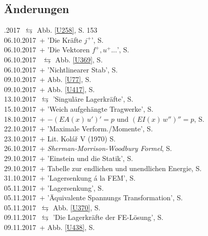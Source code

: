 {\textcolor{blau2}{\section*{\"{A}nderungen}}

{.2017} \,$\leftrightarrows$ Abb. \ref{U258}, S. 153\\
06.10.2017 \,+ 'Die Kr\"{a}fte $j^+$', S. \pageref{Korrektur1}\\
06.10.2017 \,+  'Die Vektoren $f^+, u^+ ...$', S. \pageref{Korrektur2} \\
06.10.2017 \, $\leftrightarrows$ Abb. \ref{U369}, S. \pageref{Korrektur4} \\
06.10.2017 \,+  'Nichtlinearer Stab', S. \pageref{Korrektur5} \\
09.10.2017 \,+ Abb. \ref{U77}, S. \pageref{Korrektur6} \\
09.10.2017 \,+ Abb. \ref{U417}, S. \pageref{Korrektur7} \\
13.10.2017 \,$\leftrightarrows$  'Singul\"{a}re Lagerkr\"{a}fte', S. \pageref{Korrektur9} \\
15.10.2017 \,+  'Weich aufgeh\"{a}ngte Tragwerke', S. \pageref{Korrektur10} \\
18.10.2017 \,+ $-(EA(x)\,u')' = p$ und $(EI(x)\,w'')'' = p$, S. \pageref{Korrektur11} \\
22.10.2017 \,+  'Maximale Verform./Momente', S. \pageref{Korrektur12} \\
23.10.2017 \,+ Lit. Kol\'{a}\v{r} V (1970) S. \pageref{Korrektur13} \\
26.10.2017 \,+ {\em Sherman-Morrison-Woodbury Formel\/}, S. \pageref{Korrektur14} \\
29.10.2017 \,+  'Einstein und die Statik', S. \pageref{Korrektur15} \\
29.10.2017 \,+ Tabelle zur endlichen und unendlichen Energie, S. \pageref{Korrektur16} \\
31.10.2017 \,+  'Lagersenkung \'{a} la FEM', S. \pageref{Korrektur17} \\
05.11.2017 \,+  'Lagersenkung', S. \pageref{Korrektur18} \\
05.11.2017 \,+  '\"{A}quivalente Spannungs Transformation', S. \pageref{Korrektur41}\\
05.11.2017 \,$\leftrightarrows$ Abb. \ref{U370}, S. \pageref{Korrektur19}\\
09.11.2017 \,$\leftrightarrows$  'Die Lagerkr\"{a}fte der FE-L\"{o}sung', S. \pageref{Korrektur20}\\
09.11.2017 \,+ Abb. \ref{U438}, S. \pageref{Korrektur21}\\
}
